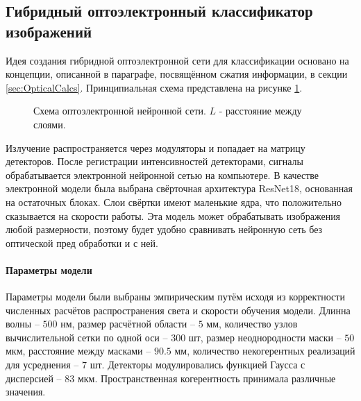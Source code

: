 \subsection{Гибридный оптоэлектронный классификатор изображений}
Идея создания гибридной оптоэлектронной сети для классификации основано на концепции, описанной в параграфе, посвящённом сжатия информации, в секции \ref{sec:OpticalCalcs}. Принципиальная схема представлена на рисунке \ref{ris:OEScheme}.
\begin{figure}[h]
	\caption{Схема оптоэлектронной нейронной сети. $L$ - расстояние между слоями.}
	\label{ris:OEScheme}
\end{figure}
Излучение распространяется через модуляторы и попадает на матрицу детекторов. После регистрации интенсивностей детекторами, сигналы обрабатывается электронной нейронной сетью на компьютере. В качестве электронной модели была выбрана свёрточная архитектура ResNet18, основанная на остаточных блоках. Слои свёртки  имеют маленькие ядра, что положительно сказывается на скорости работы. Эта модель может обрабатывать изображения любой размерности, поэтому будет удобно сравнивать нейронную сеть без оптической пред обработки и с ней.

\paragraph{Параметры модели}
Параметры модели были выбраны эмпирическим путём исходя из корректности численных расчётов распространения света и скорости обучения модели. Длинна волны -- $500$ нм, размер расчётной области -- $5$ мм, количество узлов вычислительной сетки по одной оси -- $300$ шт, размер неоднородности маски -- $50$ мкм, расстояние между масками -- $90.5$ мм, количество некогерентных реализаций для усреднения -- $7$ шт. Детекторы модулировались функцией Гаусса с дисперсией -- $83$ мкм. Пространственная когерентность принимала различные значения.

